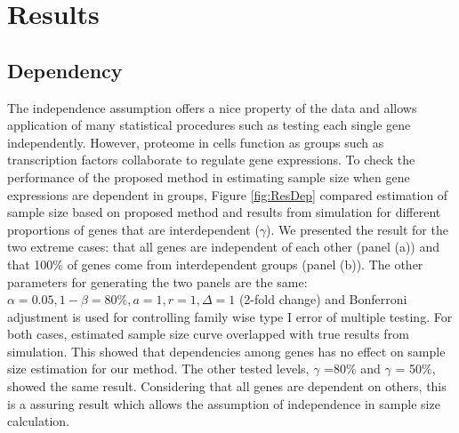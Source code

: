 \documentclass{bioinfo}
\begin{document}
\section{Results}

\subsection{Dependency}

The independence assumption offers a nice property of the data and
allows application of many statistical procedures such as testing
each single gene independently. However, proteome in cells
function as groups such as transcription factors collaborate to
regulate gene expressions. To check the performance of the
proposed method in estimating sample size when gene expressions
are dependent in groups, Figure \ref{fig:ResDep} compared
estimation of sample size based on proposed method and results
from simulation for different proportions of genes that are
interdependent ($\gamma$). We presented the result for the two
extreme cases: that all genes are independent of each other (panel
(a)) and that 100\% of genes come from interdependent groups
(panel (b)). The other parameters for generating the two panels
are the same: $\alpha = 0.05, 1 - \beta = 80\%, a = 1, r = 1,
\Delta = 1$ (2-fold change) and Bonferroni adjustment is used for
controlling family wise type I error of multiple testing. For both
cases, estimated sample size curve overlapped with true results
from simulation. This showed that dependencies among genes has no
effect on sample size estimation for our method. The other tested
levels, $\gamma$ =80\% and $\gamma$ = 50\%, showed the same
result. Considering that all genes are dependent on others, this
is a assuring result which allows the assumption of independence
in sample size calculation.
\end{document}
